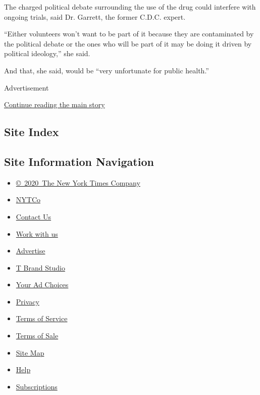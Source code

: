 The charged political debate surrounding the use of the drug could
interfere with ongoing trials, said Dr. Garrett, the former C.D.C.
expert.

``Either volunteers won't want to be part of it because they are
contaminated by the political debate or the ones who will be part of it
may be doing it driven by political ideology,'' she said.

And that, she said, would be ``very unfortunate for public health.''

Advertisement

\protect\hyperlink{after-bottom}{Continue reading the main story}

\hypertarget{site-index}{%
\subsection{Site Index}\label{site-index}}

\hypertarget{site-information-navigation}{%
\subsection{Site Information
Navigation}\label{site-information-navigation}}

\begin{itemize}
\tightlist
\item
  \href{https://help.nytimes.com/hc/en-us/articles/115014792127-Copyright-notice}{©~2020~The
  New York Times Company}
\end{itemize}

\begin{itemize}
\tightlist
\item
  \href{https://www.nytco.com/}{NYTCo}
\item
  \href{https://help.nytimes.com/hc/en-us/articles/115015385887-Contact-Us}{Contact
  Us}
\item
  \href{https://www.nytco.com/careers/}{Work with us}
\item
  \href{https://nytmediakit.com/}{Advertise}
\item
  \href{http://www.tbrandstudio.com/}{T Brand Studio}
\item
  \href{https://www.nytimes.com/privacy/cookie-policy\#how-do-i-manage-trackers}{Your
  Ad Choices}
\item
  \href{https://www.nytimes.com/privacy}{Privacy}
\item
  \href{https://help.nytimes.com/hc/en-us/articles/115014893428-Terms-of-service}{Terms
  of Service}
\item
  \href{https://help.nytimes.com/hc/en-us/articles/115014893968-Terms-of-sale}{Terms
  of Sale}
\item
  \href{https://spiderbites.nytimes.com}{Site Map}
\item
  \href{https://help.nytimes.com/hc/en-us}{Help}
\item
  \href{https://www.nytimes.com/subscription?campaignId=37WXW}{Subscriptions}
\end{itemize}
